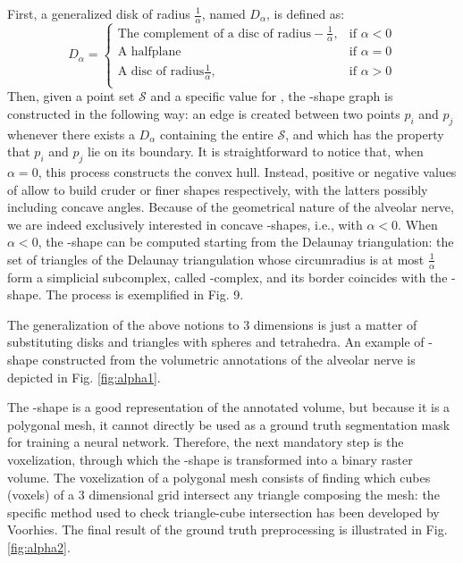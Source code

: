 First, a generalized disk of radius $\frac{1}{\alpha}$, named $D_\alpha$, is
defined as:
$$
D_\alpha=
\begin{cases}
  \text{The complement of a disc of radius} -\frac{1}{\alpha}, & \text{if $\alpha<0$}\\
  \text{A halfplane} & \text{if $\alpha=0$}\\
  \text{A disc of radius} \frac{1}{\alpha}, & \text{if $\alpha>0$}\\
\end{cases}
$$
Then, given a point set $\mathcal{S}$ and a specific value for \textalpha, the
\textalpha-shape graph is constructed in the following way: an edge is
created between two points $p_i$ and $p_j$ whenever there exists
a $D_\alpha$ containing the entire $\mathcal{S}$, and which has the property
that $p_i$ and $p_j$ lie on its boundary. It is straightforward to
notice that, when $\alpha = 0$, this process constructs the convex
hull. Instead, positive or negative values of \textalpha\;allow to build
cruder or finer shapes respectively, with the latters possibly including concave
angles. Because of the geometrical nature of the alveolar nerve, we are indeed
exclusively interested in concave \textalpha-shapes, i.e., with $\alpha < 0$.
When $\alpha < 0$, the \textalpha-shape can be computed starting from the
Delaunay triangulation: the set of triangles of the Delaunay triangulation whose
circumradius is at most $\frac{1}{\alpha}$ form a simplicial subcomplex, called
\textalpha-complex, and its border coincides with the \textalpha-shape.
The process is exemplified in Fig. 9.

The generalization of the above notions to $3$ dimensions is just a matter of
substituting disks and triangles with spheres and tetrahedra. An example of
\textalpha-shape constructed from the volumetric annotations of the alveolar
nerve is depicted in Fig. \ref{fig:alpha1}.

The \textalpha-shape is a good representation of the annotated volume, but
because it is a polygonal mesh, it cannot directly be used as a ground truth
segmentation mask for training a neural network. Therefore, the next mandatory
step is the voxelization, through which the \textalpha-shape is transformed into
a binary raster volume. The voxelization of a polygonal mesh consists of finding
which cubes (voxels) of a 3 dimensional grid intersect any triangle composing
the mesh: the specific method used to check triangle-cube intersection has been
developed by Voorhies. The final result of the ground truth preprocessing is
illustrated in Fig. \ref{fig:alpha2}.
